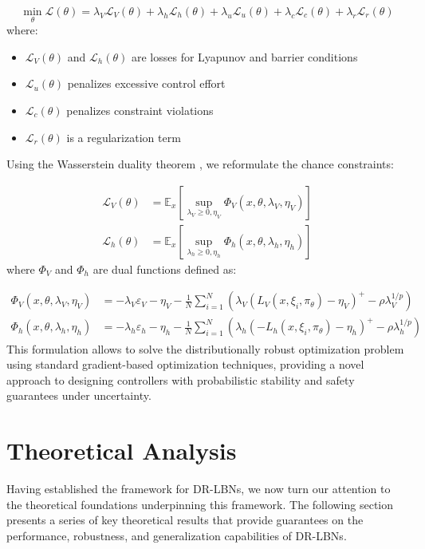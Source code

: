 \documentclass[11pt, oneside]{article}
\begin{document}
\begin{equation}
    \min_{\theta} \mathcal{L}(\theta) = \lambda_V \mathcal{L}_V(\theta) + \lambda_h \mathcal{L}_h(\theta) + \lambda_u \mathcal{L}_u(\theta) + \lambda_c \mathcal{L}_c(\theta) + \lambda_r \mathcal{L}_r(\theta)
\end{equation}
%
where:
\begin{itemize}
    \item $\mathcal{L}_V(\theta)$ and $\mathcal{L}_h(\theta)$ are losses for Lyapunov and barrier conditions
    \item $\mathcal{L}_u(\theta)$ penalizes excessive control effort
    \item $\mathcal{L}_c(\theta)$ penalizes constraint violations
    \item $\mathcal{L}_r(\theta)$ is a regularization term
\end{itemize}
%
Using the Wasserstein duality theorem \cite{rachev1990duality}, we reformulate the chance constraints:

\begin{align}
    \mathcal{L}_V(\theta) &= \mathbb{E}_{x}\left[\sup_{\lambda_V \geq 0, \eta_V} \Phi_V(x, \theta, \lambda_V, \eta_V)\right] \\
    \mathcal{L}_h(\theta) &= \mathbb{E}_{x}\left[\sup_{\lambda_h \geq 0, \eta_h} \Phi_h(x, \theta, \lambda_h, \eta_h)\right]
\end{align}
%
where $\Phi_V$ and $\Phi_h$ are dual functions defined as:

\begin{align}
    \Phi_V(x, \theta, \lambda_V, \eta_V) &= -\lambda_V\varepsilon_V - \eta_V - \frac{1}{N}\sum_{i=1}^N (\lambda_V(L_V(x, \xi_i, \pi_\theta) - \eta_V)^+ - \rho\lambda_V^{1/p}) \\
    \Phi_h(x, \theta, \lambda_h, \eta_h) &= -\lambda_h\varepsilon_h - \eta_h - \frac{1}{N}\sum_{i=1}^N (\lambda_h(-L_h(x, \xi_i, \pi_\theta) - \eta_h)^+ - \rho\lambda_h^{1/p})
\end{align}
%
This formulation allows to solve the distributionally robust optimization problem using standard gradient-based optimization techniques, providing a novel approach to designing controllers with probabilistic stability and safety guarantees under uncertainty.

\section{Theoretical Analysis}

Having established the framework for DR-LBNs, we now turn our attention to the theoretical foundations underpinning this framework. The following section presents a series of key theoretical results that provide guarantees on the performance, robustness, and generalization capabilities of DR-LBNs.
\end{document}
